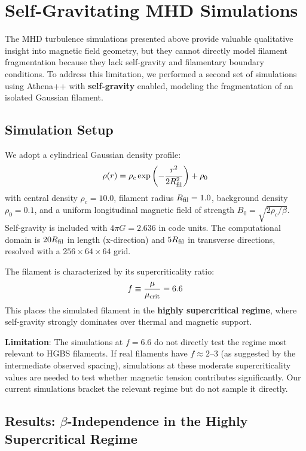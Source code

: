 \documentclass[11pt,a4paper]{article}
\begin{document}
\section{Self-Gravitating MHD Simulations}
\label{sec:simulations_sg}

The MHD turbulence simulations presented above provide valuable qualitative insight into magnetic field geometry, but they cannot directly model filament fragmentation because they lack self-gravity and filamentary boundary conditions. To address this limitation, we performed a second set of simulations using Athena++ with \textbf{self-gravity} enabled, modeling the fragmentation of an isolated Gaussian filament.

\subsection{Simulation Setup}

We adopt a cylindrical Gaussian density profile:
\begin{equation}
\rho(r) = \rho_c \exp\left(-\frac{r^2}{2 R_{\rm fil}^2}\right) + \rho_0
\end{equation}
with central density $\rho_c = 10.0$, filament radius $R_{\rm fil} = 1.0$, background density $\rho_0 = 0.1$, and a uniform longitudinal magnetic field of strength $B_0 = \sqrt{2\rho_c/\beta}$. Self-gravity is included with $4\pi G = 2.636$ in code units. The computational domain is $20 R_{\rm fil}$ in length (x-direction) and $5 R_{\rm fil}$ in transverse directions, resolved with a $256 \times 64 \times 64$ grid.

The filament is characterized by its supercriticality ratio:
\begin{equation}
f \equiv \frac{\mu}{\mu_{\rm crit}} = 6.6
\end{equation}
This places the simulated filament in the \textbf{highly supercritical regime}, where self-gravity strongly dominates over thermal and magnetic support.

\textbf{Limitation}: The simulations at $f = 6.6$ do not directly test the regime most relevant to HGBS filaments. If real filaments have $f \approx 2$--$3$ (as suggested by the intermediate observed spacing), simulations at these moderate supercriticality values are needed to test whether magnetic tension contributes significantly. Our current simulations bracket the relevant regime but do not sample it directly.

\subsection{Results: $\beta$-Independence in the Highly Supercritical Regime}
\end{document}
